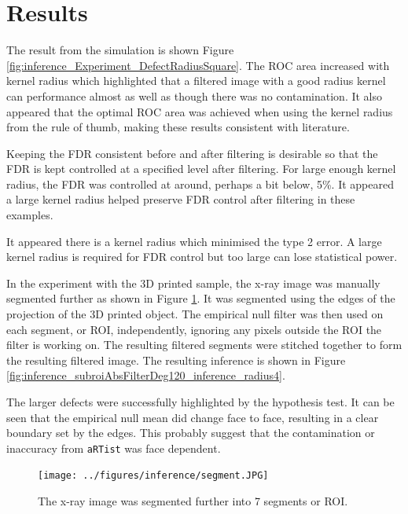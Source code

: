 \documentclass{proc}
\begin{document}
\section{Results}

The result from the simulation is shown Figure \ref{fig:inference_Experiment_DefectRadiusSquare}. The ROC area increased with kernel radius which highlighted that a filtered image with a good radius kernel can performance almost as well as though there was no contamination. It also appeared that the optimal ROC area was achieved when using the kernel radius from the rule of thumb, making these results consistent with literature.

Keeping the FDR consistent before and after filtering is desirable so that the FDR is kept controlled at a specified level after filtering. For large enough kernel radius, the FDR was controlled at around, perhaps a bit below, 5\%. It appeared a large kernel radius helped preserve FDR control after filtering in these examples. 

It appeared there is a kernel radius which minimised the type 2 error. A large kernel radius is required for FDR control but too large can lose statistical power.

In the experiment with the 3D printed sample, the x-ray image was manually segmented further as shown in Figure \ref{fig:inference_segmentFurther}. It was segmented using the edges of the projection of the 3D printed object. The empirical null filter was then used on each segment, or ROI, independently, ignoring any pixels outside the ROI the filter is working on. The resulting filtered segments were stitched together to form the resulting filtered image. The resulting inference is shown in Figure \ref{fig:inference_subroiAbsFilterDeg120_inference_radius4}.

The larger defects were successfully highlighted by the hypothesis test. It can be seen that the empirical null mean did change face to face, resulting in a clear boundary set by the edges. This probably suggest that the contamination or inaccuracy from \texttt{aRTist} was face dependent.

\begin{figure}
  \centering
  \texttt{[image: ../figures/inference/segment.JPG]}
  \caption{The x-ray image was segmented further into 7 segments or ROI.}
  \label{fig:inference_segmentFurther}
\end{figure}
\end{document}
